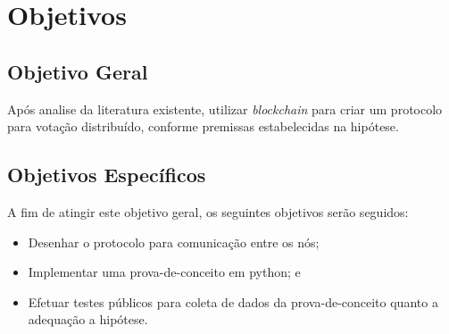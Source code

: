 \chapter{Objetivos}
\section{Objetivo Geral}
Após analise da literatura existente, utilizar \textit{blockchain} para criar um protocolo para votação distribuído, conforme premissas estabelecidas na hipótese.

\section{Objetivos Específicos}
A fim de atingir este objetivo geral, os seguintes objetivos serão seguidos:

\begin{itemize}
	\item Desenhar o protocolo para comunicação entre os nós;
	\item Implementar uma prova-de-conceito em python; e
	\item Efetuar testes públicos para coleta de dados da prova-de-conceito quanto a adequação a hipótese.
\end{itemize}


